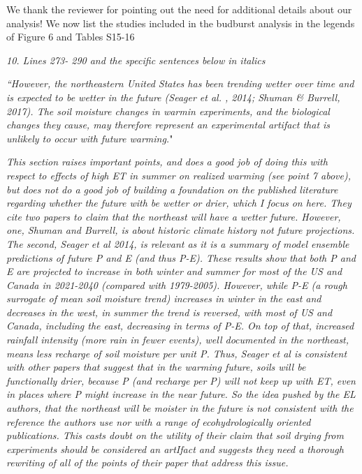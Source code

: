 \documentclass[11pt,a4paper]{letter}
\begin{document}
\begin{letter}{}
\par We thank the reviewer for pointing out the need for additional details about our analysis! We now list the studies included in the budburst analysis in the legends of Figure 6 and Tables S15-16
\\
\par \emph{10. Lines 273- 290 and the specific sentences below in italics} 
\par \emph{``However, the northeastern United States has been trending wetter over time and is expected to be wetter in the future (Seager et al. , 2014; Shuman & Burrell, 2017). The soil moisture changes in warmin experiments, and the biological changes they cause, may therefore represent an experimental artifact that is unlikely to occur with future warming.}"
\par \emph{This section raises important points, and does a good job of doing this with respect to effects of high ET in summer on realized warming (see point 7 above), but does not do a good job of building a foundation on the published literature regarding whether the future with be wetter or drier, which I focus on here. They cite two papers to claim that the northeast will have a wetter future. However, one, Shuman and Burrell, is about historic climate history not future projections. The second, Seager et al 2014, is relevant as it is a summary of model ensemble predictions of future P and E (and thus P-E). These results show that both P and E are projected to increase in both winter and summer for most of the US and Canada in 2021-2040 (compared with 1979-2005). However, while P-E (a rough surrogate of mean soil moisture trend) increases in winter in the east and decreases in the west, in summer the trend is reversed, with most of US and Canada, including the east, decreasing in terms of P-E. On top of that, increased rainfall intensity (more rain in fewer events), well documented in the northeast, means less recharge of soil moisture per unit P. Thus, Seager et al is consistent with other papers that suggest that in the warming future, soils will be functionally drier, because P (and recharge per P) will not keep up with ET, even in places where P might increase in the near future. So the idea pushed by the EL authors, that the northeast will be moister in the future is not consistent with the reference the authors use nor with a range of ecohydrologically oriented publications. This casts doubt on the utility of their claim that soil drying from experiments should be considered an artIfact and suggests they need a thorough rewriting of all of the points of their paper that address this issue.}


\end{letter}
\end{document}
